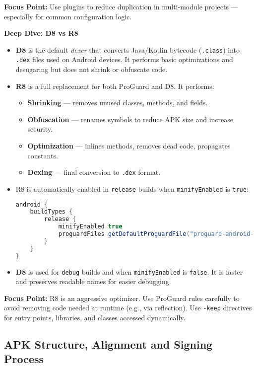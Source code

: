 \documentclass[a4paper,12pt]{article}
\begin{document}
\textbf{Focus Point:} Use plugins to reduce duplication in multi-module projects — especially for common configuration logic.

\textbf{Deep Dive: D8 vs R8}

\begin{itemize}
  \item \textbf{D8} is the default \textit{dexer} that converts Java/Kotlin bytecode (\texttt{.class}) into \texttt{.dex} files used on Android devices. It performs basic optimizations and desugaring but does not shrink or obfuscate code.
  
  \item \textbf{R8} is a full replacement for both ProGuard and D8. It performs:
  \begin{itemize}
    \item \textbf{Shrinking} — removes unused classes, methods, and fields.
    \item \textbf{Obfuscation} — renames symbols to reduce APK size and increase security.
    \item \textbf{Optimization} — inlines methods, removes dead code, propagates constants.
    \item \textbf{Dexing} — final conversion to \texttt{.dex} format.
  \end{itemize}

  \item R8 is automatically enabled in \texttt{release} builds when \texttt{minifyEnabled} is \texttt{true}:
\begin{lstlisting}[language=Groovy]
android {
    buildTypes {
        release {
            minifyEnabled true
            proguardFiles getDefaultProguardFile("proguard-android-optimize.txt"), "proguard-rules.pro"
        }
    }
}
\end{lstlisting}

  \item \textbf{D8} is used for \texttt{debug} builds and when \texttt{minifyEnabled} is \texttt{false}. It is faster and preserves readable names for easier debugging.

\end{itemize}

\textbf{Focus Point:} R8 is an aggressive optimizer. Use ProGuard rules carefully to avoid removing code needed at runtime (e.g., via reflection). Use \texttt{-keep} directives for entry points, libraries, and classes accessed dynamically.

\subsection{APK Structure, Alignment and Signing Process}
\end{document}
